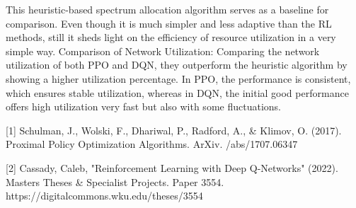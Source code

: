\documentclass[conference]{IEEEtran}
\begin{document}
This heuristic-based spectrum allocation algorithm serves as a baseline for comparison. Even though it is much simpler and less adaptive than the RL methods, still it sheds light on the efficiency of resource utilization in a very simple way.
Comparison of Network Utilization: Comparing the network utilization of both PPO and DQN, they outperform the heuristic algorithm by showing a higher utilization percentage. In PPO, the performance is consistent, which ensures stable utilization, whereas in DQN, the initial good performance offers high utilization very fast but also with some fluctuations.




[1] Schulman, J., Wolski, F., Dhariwal, P., Radford, A., & Klimov, O. (2017). Proximal Policy Optimization Algorithms. ArXiv. /abs/1707.06347

[2] Cassady, Caleb, "Reinforcement Learning with Deep Q-Networks" (2022). Masters Theses & Specialist Projects. Paper 3554.
https://digitalcommons.wku.edu/theses/3554
\end{document}
